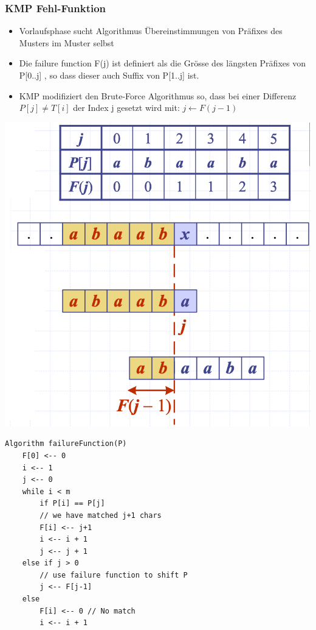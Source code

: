 \subsubsection{KMP Fehl-Funktion}
\begin{itemize}
    \item Vorlaufsphase sucht Algorithmus Übereinstimmungen von Präfixes des Musters im Muster selbst
    \item Die failure function F(j) ist definiert als die Grösse des längsten Präfixes von P[0..j] , so dass dieser auch Suffix von P[1..j] ist.
    \item KMP modifiziert den Brute-Force Algorithmus so, dass bei einer Differenz $P[j] \neq T[i]$ der Index j gesetzt wird mit: $ j \leftarrow F(j-1)$
\end{itemize}
\vspace{-8pt}
\begin{center}
    \includegraphics[scale=.22]{graphic/08 PatternMatching/KMP Fehl.png}
\end{center}
\vspace{-8pt}
\begin{lstlisting}
Algorithm failureFunction(P)
    F[0] <-- 0
    i <-- 1
    j <-- 0
    while i < m
        if P[i] == P[j]
        // we have matched j+1 chars
        F[i] <-- j+1
        i <-- i + 1
        j <-- j + 1
    else if j > 0
        // use failure function to shift P
        j <-- F[j-1]
    else
        F[i] <-- 0 // No match
        i <-- i + 1
\end{lstlisting}
